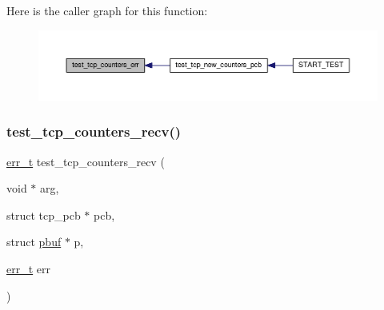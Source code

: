 Here is the caller graph for this function\+:
\nopagebreak
\begin{figure}[H]
\begin{center}
\leavevmode
\includegraphics[width=350pt]{openmote-cc2538_2lwip_2test_2unit_2tcp_2tcp__helper_8h_a3ddbc387487935205c08c161223031c7_icgraph}
\end{center}
\end{figure}
\mbox{\label{openmote-cc2538_2lwip_2test_2unit_2tcp_2tcp__helper_8h_a6618a2d98d08a43995474cd3ef6704fc}} 
\subsubsection{\texorpdfstring{test\+\_\+tcp\+\_\+counters\+\_\+recv()}{test\_tcp\_counters\_recv()}}
{\footnotesize\ttfamily \hyperlink{group__infrastructure__errors_gaf02d9da80fd66b4f986d2c53d7231ddb}{err\+\_\+t} test\+\_\+tcp\+\_\+counters\+\_\+recv (\begin{DoxyParamCaption}\item[{void $\ast$}]{arg,  }\item[{struct tcp\+\_\+pcb $\ast$}]{pcb,  }\item[{struct \hyperlink{structpbuf}{pbuf} $\ast$}]{p,  }\item[{\hyperlink{group__infrastructure__errors_gaf02d9da80fd66b4f986d2c53d7231ddb}{err\+\_\+t}}]{err }\end{DoxyParamCaption})}

